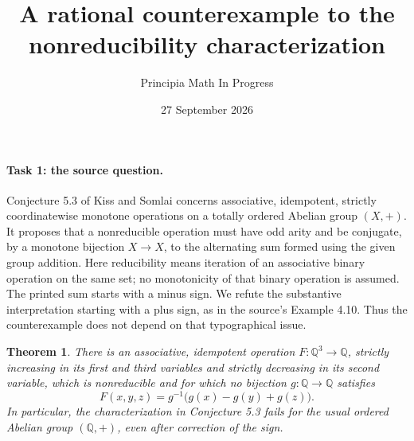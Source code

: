 \documentclass[11pt]{article}
\title{A rational counterexample to the nonreducibility characterization}
\author{Principia Math In Progress}
\date{27 September 2026}
\newtheorem{theorem}{Theorem}
\newcommand{\Q}{\mathbb Q}
\begin{document}
\maketitle

\paragraph{Task 1: the source question.}
Conjecture 5.3 of Kiss and Somlai \cite{KS} concerns associative,
idempotent, strictly coordinatewise monotone operations on a totally
ordered Abelian group $(X,+)$. It proposes that a nonreducible operation
must have odd arity and be conjugate, by a monotone bijection $X\to X$,
to the alternating sum formed using the given group addition.
Here reducibility means iteration of an associative binary operation on
the same set; no monotonicity of that binary operation is assumed.
The printed sum starts with a minus sign. We refute the substantive
interpretation starting with a plus sign, as in the source's Example 4.10.
Thus the counterexample does not depend on that typographical issue.

\begin{theorem}
There is an associative, idempotent operation $F:\Q^3\to\Q$, strictly
increasing in its first and third variables and strictly decreasing in its
second variable, which is nonreducible and for which no bijection
$g:\Q\to\Q$ satisfies
\begin{equation}\label{eq:claimed}
 F(x,y,z)=g^{-1}\bigl(g(x)-g(y)+g(z)\bigr).
\end{equation}
In particular, the characterization in Conjecture 5.3 fails for the
usual ordered Abelian group $(\Q,+)$, even after correction of the sign.
\end{theorem}
\end{document}
